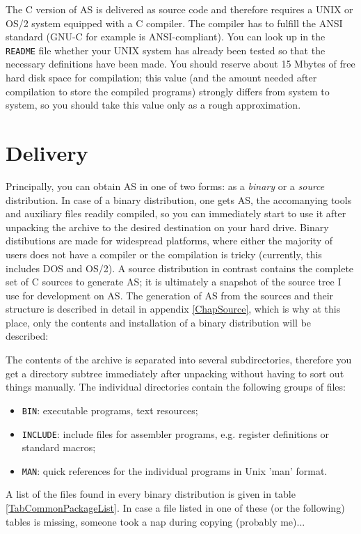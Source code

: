 \documentclass[12pt,twoside]{report}
\newcommand{\tty}[1]{{\tt #1}}
\newcommand{\asname}{{AS}}
\begin{document}
The C version of \asname{}  is delivered as source code and
therefore requires a UNIX or OS/2 system equipped with a C compiler.  The
compiler has to fulfill the ANSI standard (GNU-C for example is
ANSI-compliant).  You can look up in the \tty{README} file whether your
UNIX system has already been tested so that the necessary definitions have
been made.  You should reserve about 15 Mbytes of free hard disk space for
compilation; this value (and the amount needed after compilation to store
the compiled programs) strongly differs from system to system, so you
should take this value only as a rough approximation.


\section{Delivery}

Principally, you can obtain \asname{} in one of two forms: as a {\em binary} or a
{\em source} distribution.  In case of a binary distribution, one gets \asname{},
the accomanying tools and auxiliary files readily compiled, so you can
immediately start to use it after unpacking the archive to the desired
destination on your hard drive.
Binary distibutions are made for widespread platforms, where either the
majority of users does not have a compiler or the compilation is tricky
(currently, this includes DOS and OS/2).  A source distribution in
contrast contains the complete set of C sources to generate \asname{}; it is
ultimately a snapshot of the source tree I use for development on \asname{}.  The
generation of \asname{} from the sources and their structure is described in
detail in appendix \ref{ChapSource}, which is why at this place, only the
contents and installation of a binary distribution will be described:

The contents of the archive is separated into several subdirectories,
therefore you get a directory subtree immediately after unpacking without
having to sort out things manually.  The individual directories contain
the following groups of files:
\begin{itemize}
\item{{\tt BIN}: executable programs, text resources;}
\item{{\tt INCLUDE}: include files for assembler programs, e.g. register
      definitions or standard macros;}
\item{{\tt MAN}: quick references for the individual programs in Unix
      'man' format.}
\end{itemize}
A list of the files found in every binary distribution is given in table
\ref{TabCommonPackageList}.  In case a file listed in one of these (or the
following) tables is missing, someone took a nap during copying (probably
me)...
\end{document}
